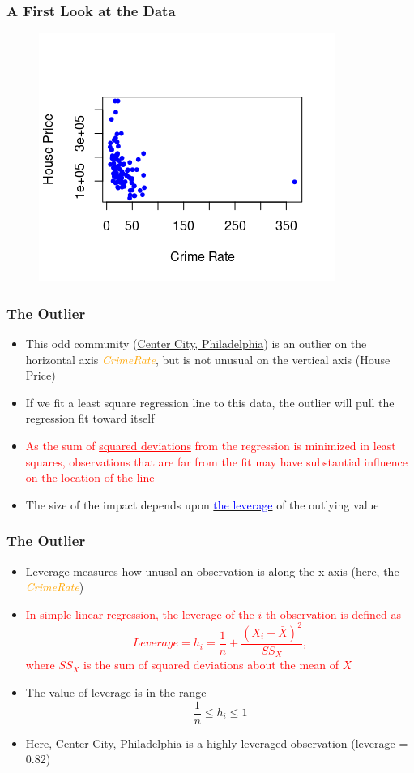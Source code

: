 \documentclass[10pt]{beamer}
\theoremstyle{plain}
\begin{document}
\begin{frame}
\frametitle{\sc A First Look at the Data}
	\begin{figure}[!ht]
		\centering
		\includegraphics[scale=0.9]{figs8/scatter-all.png}
	\end{figure}
\end{frame}

\begin{frame}
\frametitle{\sc The Outlier}
	\begin{itemize}
		\item This odd community (\underline{Center City, Philadelphia})  is an outlier on the horizontal axis \textcolor{orange}{\textit{CrimeRate}}, but is not unusual on the vertical axis (House Price)
		\item If we fit a least square regression line to this data, the outlier will pull the regression fit toward itself
		\item \textcolor{red}{As the sum of \underline{squared deviations} from the regression is minimized in least squares, observations that are far from the fit may have substantial influence on the location of the line}
		\item The size of the impact depends upon \underline{\textcolor{blue}{the leverage}} of the outlying value
    \end{itemize}		
\end{frame}

\begin{frame}
\frametitle{\sc The Outlier}
	\begin{itemize}
		\item Leverage measures how unusal an observation is along the x-axis (here, the \textcolor{orange}{\textit{CrimeRate}})
		\item \textcolor{red}{In simple linear regression, the leverage of the $i$-th observation is defined as
		\[
		Leverage = h_i = \frac{1}{n} + \frac{(X_i - \bar{X})^2}{SS_X},
		\]
		where $SS_X$ is the sum of squared deviations about the mean of $X$}
		\item The value of leverage is in the range 
		\[
		\frac{1}{n} \leq h_i \leq 1
		\]
		\item Here, Center City, Philadelphia is a highly leveraged observation (leverage = 0.82)
    \end{itemize}		
\end{frame}
\end{document}
